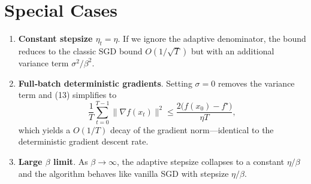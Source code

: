 \documentclass[11pt]{article}
\newcommand{\grad}{\nabla}
\begin{document}
\section*{Special Cases}
\begin{enumerate}
\item \textbf{Constant stepsize $\eta_{t}=\eta$}. If we ignore the adaptive denominator, the bound reduces to the classic SGD bound $O(1/\sqrt{T})$ but with an additional variance term $\sigma^{2}/\beta^{2}$.
\item \textbf{Full‑batch deterministic gradients}. Setting $\sigma=0$ removes the variance term and (13) simplifies to
\[
\frac{1}{T}\sum_{t=0}^{T-1}\|\grad f(x_{t})\|^{2}
\le \frac{2\big(f(x_{0})-f^{\star}\big)}{\eta T},
\]
which yields a $O(1/T)$ decay of the gradient norm—identical to the deterministic gradient descent rate.
\item \textbf{Large $\beta$ limit}. As $\beta\to\infty$, the adaptive stepsize collapses to a constant $\eta/\beta$ and the algorithm behaves like vanilla SGD with stepsize $\eta/\beta$.
\end{enumerate}
\end{document}

